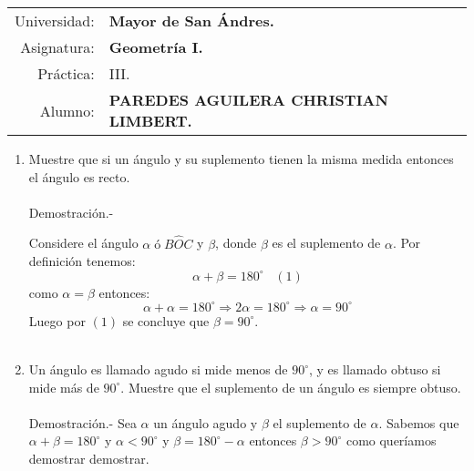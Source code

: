 \documentclass[10pt]{article}
\begin{document}
\begin{tabular}{r l }
Universidad: & \textbf{Mayor de San Ándres.}\\
Asignatura: & \textbf{Geometría I.}\\
 Práctica: & III.\\ 
Alumno: & \textbf{PAREDES AGUILERA CHRISTIAN LIMBERT.}
\end{tabular}
\begin{flushleft}
\end{flushleft}



    \begin{enumerate}

	\item Muestre que si un ángulo y su suplemento tienen la misma medida entonces el ángulo es recto.\\\\
	    Demostración.-\;  

	    \begin{center}
	    \end{center}

	    Considere el ángulo $\alpha \; ó \; B \widehat{O} C$ y $\beta$, donde $\beta$ es el suplemento de $\alpha$. Por definición tenemos: $$ \alpha + \beta = 180^{\circ} \;\;\; (1)$$ como $\alpha = \beta$ entonces: $$\alpha + \alpha = 180^{\circ} \Rightarrow 2\alpha = 180^{\circ} \Rightarrow \alpha = 90^{\circ}$$ Luego por $(1)$ se concluye que $\beta = 90^{\circ}$.\\\\

	\item Un ángulo es llamado agudo si mide menos de $90^{\circ}$, y es llamado obtuso si mide más de $90^{\circ}$. Muestre que el suplemento de un ángulo es siempre obtuso.\\\\
	    Demostración.-\; Sea $\alpha$ un ángulo agudo y $\beta$  el suplemento de $\alpha$. Sabemos que $\alpha + \beta = 180^{\circ}$ y $\alpha < 90^{\circ}$ y $\beta = 180^{\circ} - \alpha$ entonces $\beta > 90^{\circ}$ como queríamos demostrar demostrar.\\\\


\end{enumerate}
\end{document}
